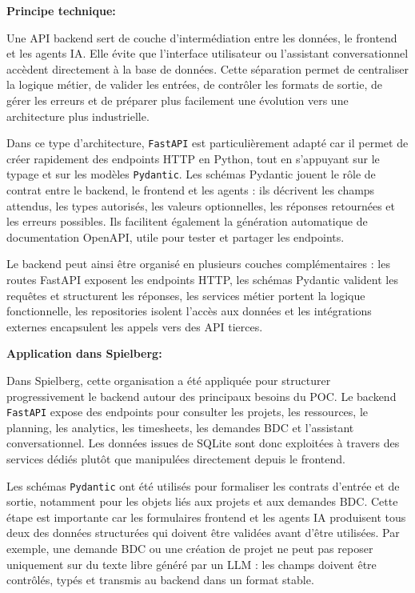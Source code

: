 \documentclass[a4paper,11pt,english,openany]{book}
\begin{document}
\textbf{Principe technique:}

Une API backend sert de couche d'intermédiation entre les données, le frontend et les agents IA. Elle évite que l'interface utilisateur ou l'assistant conversationnel accèdent directement à la base de données. Cette séparation permet de centraliser la logique métier, de valider les entrées, de contrôler les formats de sortie, de gérer les erreurs et de préparer plus facilement une évolution vers une architecture plus industrielle.

Dans ce type d'architecture, \texttt{FastAPI} est particulièrement adapté car il permet de créer rapidement des endpoints HTTP en Python, tout en s'appuyant sur le typage et sur les modèles \texttt{Pydantic}. Les schémas Pydantic jouent le rôle de contrat entre le backend, le frontend et les agents : ils décrivent les champs attendus, les types autorisés, les valeurs optionnelles, les réponses retournées et les erreurs possibles. Ils facilitent également la génération automatique de documentation OpenAPI, utile pour tester et partager les endpoints.

Le backend peut ainsi être organisé en plusieurs couches complémentaires : les routes FastAPI exposent les endpoints HTTP, les schémas Pydantic valident les requêtes et structurent les réponses, les services métier portent la logique fonctionnelle, les repositories isolent l'accès aux données et les intégrations externes encapsulent les appels vers des API tierces.

\textbf{Application dans Spielberg:}

Dans Spielberg, cette organisation a été appliquée pour structurer progressivement le backend autour des principaux besoins du POC. Le backend \texttt{FastAPI} expose des endpoints pour consulter les projets, les ressources, le planning, les analytics, les timesheets, les demandes BDC et l'assistant conversationnel. Les données issues de SQLite sont donc exploitées à travers des services dédiés plutôt que manipulées directement depuis le frontend.

Les schémas \texttt{Pydantic} ont été utilisés pour formaliser les contrats d'entrée et de sortie, notamment pour les objets liés aux projets et aux demandes BDC. Cette étape est importante car les formulaires frontend et les agents IA produisent tous deux des données structurées qui doivent être validées avant d'être utilisées. Par exemple, une demande BDC ou une création de projet ne peut pas reposer uniquement sur du texte libre généré par un LLM : les champs doivent être contrôlés, typés et transmis au backend dans un format stable.
\end{document}
